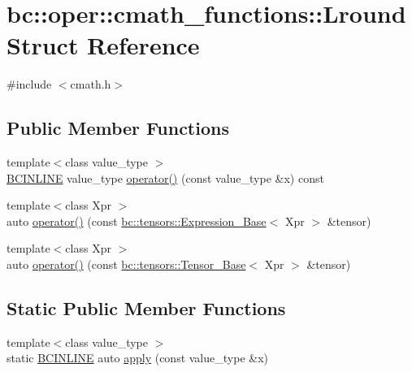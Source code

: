 \hypertarget{structbc_1_1oper_1_1cmath__functions_1_1Lround}{}\section{bc\+:\+:oper\+:\+:cmath\+\_\+functions\+:\+:Lround Struct Reference}
\label{structbc_1_1oper_1_1cmath__functions_1_1Lround}


{\ttfamily \#include $<$cmath.\+h$>$}

\subsection*{Public Member Functions}
\begin{DoxyCompactItemize}
\item 
{\footnotesize template$<$class value\+\_\+type $>$ }\\\hyperlink{common_8h_a6699e8b0449da5c0fafb878e59c1d4b1}{B\+C\+I\+N\+L\+I\+NE} value\+\_\+type \hyperlink{structbc_1_1oper_1_1cmath__functions_1_1Lround_a3034b00ef54dc823c2aa96adc59d0f9e}{operator()} (const value\+\_\+type \&x) const
\item 
{\footnotesize template$<$class Xpr $>$ }\\auto \hyperlink{structbc_1_1oper_1_1cmath__functions_1_1Lround_a3ce80332b0dadcd7fd5c6828428d8c7b}{operator()} (const \hyperlink{classbc_1_1tensors_1_1Expression__Base}{bc\+::tensors\+::\+Expression\+\_\+\+Base}$<$ Xpr $>$ \&tensor)
\item 
{\footnotesize template$<$class Xpr $>$ }\\auto \hyperlink{structbc_1_1oper_1_1cmath__functions_1_1Lround_ac8bea6158d356acde6d4e481722205a4}{operator()} (const \hyperlink{classbc_1_1tensors_1_1Tensor__Base}{bc\+::tensors\+::\+Tensor\+\_\+\+Base}$<$ Xpr $>$ \&tensor)
\end{DoxyCompactItemize}
\subsection*{Static Public Member Functions}
\begin{DoxyCompactItemize}
\item 
{\footnotesize template$<$class value\+\_\+type $>$ }\\static \hyperlink{common_8h_a6699e8b0449da5c0fafb878e59c1d4b1}{B\+C\+I\+N\+L\+I\+NE} auto \hyperlink{structbc_1_1oper_1_1cmath__functions_1_1Lround_a038919e263e1a034ca714ebb318a9270}{apply} (const value\+\_\+type \&x)
\end{DoxyCompactItemize}



